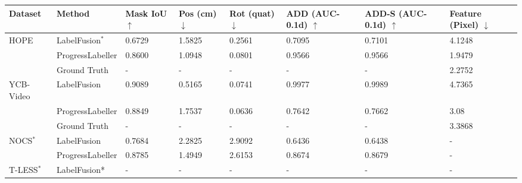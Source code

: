  \begin{table*}[htbp]
\small
   \centering
   \begin{tabular}{@{}p{2cm}p{2.2cm}p{1cm}p{1cm}p{1.2cm}p{1.8cm}p{1.8cm}p{1.4cm}@{}}
     \toprule
     Dataset & Method & Mask IoU $\uparrow$ & Pos (cm) $\downarrow$ & Rot (quat) $\downarrow$ & ADD \hphantom{1cm} (AUC-0.1d) $\uparrow$ & ADD-S (AUC-0.1d) $\uparrow$ & Feature (Pixel) $\downarrow$\\%
     \midrule
     HOPE & LabelFusion$^*$    & 0.6729  & 1.5825 & 0.2561 & 0.7095 & 0.7101 & 4.1248\\%
      & ProgressLabeller     & 0.8600  & 1.0948 & 0.0801 & 0.9566 & 0.9566 & 1.9479\\%
      & Ground Truth        & - & - & - & - & - & 2.2752\\%
     \midrule
     YCB-Video & LabelFusion  & 0.9089 & 0.5165 & 0.0741 & 0.9977 & 0.9989 & 4.7365\\%
      & ProgressLabeller      & 0.8849 & 1.7537 & 0.0636 & 0.7642 & 0.7662 & 3.08\\%
      & Ground Truth         & - & - & - & - & - & 3.3868\\%
     \midrule
     NOCS$^*$ & LabelFusion      & 0.7684 & 2.2825 & 2.9092 & 0.6436 & 0.6438 & -\\%
      & ProgressLabeller      & 0.8785 & 1.4949 & 2.6153 & 0.8674 & 0.8679 & -\\%
     \midrule
     T-LESS$^*$ & LabelFusion*    & - & - & - & - & - & -\\%

\end{tabular}
\end{table*}
